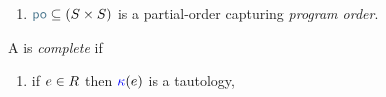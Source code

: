 \begin{definition}
\begin{enumerate}[,label=(\textsc{m}\arabic*),ref=\textsc{m}\arabic*]
\begin{multicols}{2}
\begin{enumerate}
    \item \label{pom-m-kappa} 
      if $\aEv\in\dmEvs$ then 
    \end{enumerate}
    \end{multicols}

  \item \label{pom-po} 
    ${\rpox} \subseteq (\umEvs\times\umEvs)$ is a partial-order capturing
    \emph{program order}.
  \end{enumerate}


  A \PwTpo{} is \emph{complete} if 
  \begin{multicols}{2}
    \begin{enumerate}[,label=(\textsc{c}\arabic*),ref=\textsc{c}\arabic*]

      \setcounter{enumi}{\value{Bkappa}}
    \item \label{top-kappa-c11}
      if $e\in R$ then ${\color{blue}\kappa}(e)$ is a tautology,



\end{enumerate}
\end{multicols}
\end{definition}
